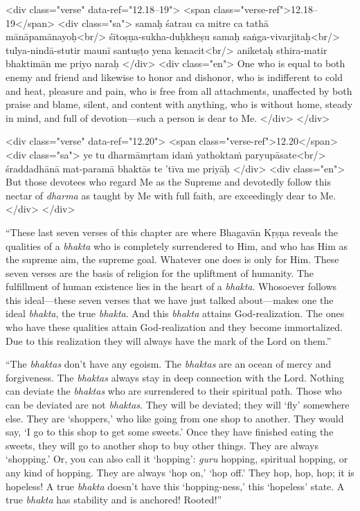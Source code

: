 \begin{html}
<div class="verse" data-ref="12.18–19">
  <span class="verse-ref">12.18–19</span>
  <div class="sa">
    samaḥ śatrau ca mitre ca tathā mānāpamānayoḥ<br/>
    śītoṣṇa-sukha-duḥkheṣu samaḥ saṅga-vivarjitaḥ<br/>
    tulya-nindā-stutir maunī santuṣṭo yena kenacit<br/>
    aniketaḥ sthira-matir bhaktimān me priyo naraḥ
  </div>
  <div class="en">
    One who is equal to both enemy and friend and likewise to honor and dishonor, who is indifferent to cold and heat, pleasure and pain, who is free from all attachments, unaffected by both praise and blame, silent, and content with anything, who is without home, steady in mind, and full of devotion---such a person is dear to Me.
  </div>
</div>
\end{html}



\begin{html}
<div class="verse" data-ref="12.20">
  <span class="verse-ref">12.20</span>
  <div class="sa">
    ye tu dharmāmṛtam idaṁ yathoktaṁ paryupāsate<br/>
    śraddadhānā mat-paramā bhaktās te ’tīva me priyāḥ
  </div>
  <div class="en">
    But those devotees who regard Me as the Supreme and devotedly follow this nectar of \textit{dharma} as taught by Me with full faith, are exceedingly dear to Me.
  </div>
</div>
\end{html}


\enquote{These last seven verses of this chapter are where Bhagavān Kṛṣṇa reveals the qualities of a \textit{bhakta} who is completely surrendered to Him, and who has Him as the supreme aim, the supreme goal. Whatever one does is only for Him. These seven verses are the basis of religion for the upliftment of humanity. The fulfillment of human existence lies in the heart of a \textit{bhakta}. Whosoever follows this ideal---these seven verses that we have just talked about---makes one the ideal \textit{bhakta}, the true \textit{bhakta}. And this \textit{bhakta} attains God-realization. The ones who have these qualities attain God-realization and they become immortalized. Due to this realization they will always have the mark of the Lord on them.}

\enquote{The \textit{bhaktas} don’t have any egoism. The \textit{bhaktas} are an ocean of mercy and forgiveness. The \textit{bhaktas} always stay in deep connection with the Lord. Nothing can deviate the \textit{bhaktas} who are surrendered to their spiritual path. Those who can be deviated are not \textit{bhaktas}. They will be deviated; they will \enquote{fly} somewhere else. They are \enquote{shoppers,} who like going from one shop to another. They would say, \enquote{I go to this shop to get some sweets.} Once they have finished eating the sweets, they will go to another shop to buy other things. They are always \enquote{shopping.} Or, you can also call it \enquote{hopping}: \textit{guru} hopping, spiritual hopping, or any kind of hopping. They are always \enquote{hop on,} \enquote{hop off.} They hop, hop, hop; it is hopeless! A true \textit{bhakta} doesn’t have this \enquote{hopping-ness,} this \enquote{hopeless} state. A true \textit{bhakta} has stability and is anchored! Rooted!}

